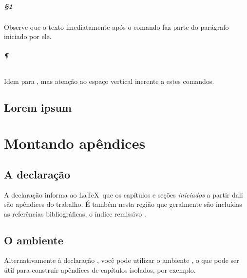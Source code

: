 \documentclass[a4paper,12pt]{book}
\begin{document}
	\paragraph{\S1\textordmasculine}
	
	Observe que o texto imediatamente após o comando  faz parte do
	parágrafo iniciado por ele.
	
	\subparagraph{\P} Idem para , mas atenção ao espaço vertical
	inerente a estes comandos.
	
	\section{Lorem ipsum}
	\lipsum[1-10]
	
	\appendix
	\chapter{Montando apêndices}
	
	\section{A declaração }
	
	A declaração  informa ao \LaTeX\ que os capítulos e seções
	\emph{iniciados} a	partir dali são apêndices do trabalho. É também nesta
	região que geralmente são incluídas as referências bibliográficas, o índice
	remissivo \etc.
	
	\section{O ambiente }
	
	Alternativamente à declaração , você pode utilizar o ambiente
	,	o que pode ser útil para construir apêndices de capítulos
	isolados, por	exemplo.
\end{document}
